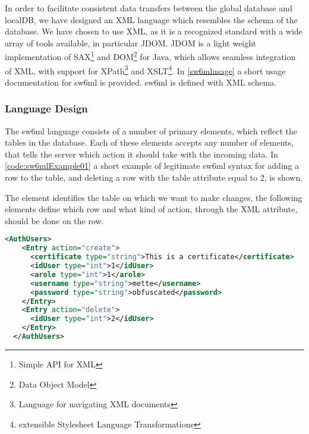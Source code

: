 In order to facilitate consistent data transfers between the global database and localDB, we have designed an XML language which resembles
the schema of the database. We have chosen to use XML, as it is a recognized standard with a wide array of tools available, in particular JDOM\cite{www.jdom.org}.
JDOM is a light weight implementation of SAX\footnote{Simple API for XML\cite{SAX}} and DOM\footnote{Data Object Model} for Java, which allows seamless integration of XML, with support for XPath\footnote{Language for navigating XML documents\cite{xPath}} and XSLT\footnote{extensible Stylesheet Language Transformations\cite{xslt}}.
In \autoref{sw6mlusage} a short usage documentation for sw6ml is provided. sw6ml is defined with XML schema.

\subsubsection{Language Design}

The sw6ml language consists of a number of primary elements, which reflect the tables in the database. Each of these elements accepts any number of  elements, that tells
the server which action it should take with the incoming data.
In \autoref{code:sw6mlExample01} a short example of legitimate sw6ml syntax for adding a row to the  table, and deleting a row with the  table attribute equal to 2, is shown.

The   element identifies the table on which we want to make changes, the following   elements
define which row and what kind of action, through the  XML attribute, should be done on the row. 

\begin{Code}
\begin{lstlisting}[label=code:sw6mlExample01,language=XML,caption=Example of sw6ml syntax]
 <AuthUsers>
    <Entry action="create">
      <certificate type="string">This is a certificate</certificate>
      <idUser type="int">1</idUser>
      <arole type="int">1</arole>
      <username type="string">mette</username>
      <password type="string">obfuscated</password>
    </Entry>
    <Entry action="delete">
      <idUser type="int">2</idUser>
    </Entry>
  </AuthUsers>
\end{lstlisting}
\end{Code}


